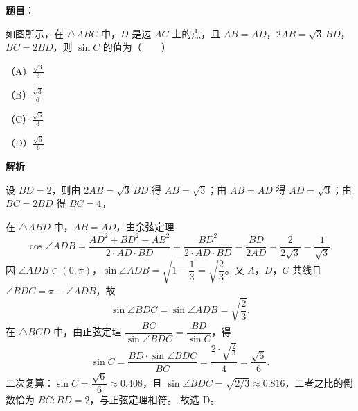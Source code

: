 \begin{answer}

\textbf{题目}：

如图所示，在 $\triangle ABC$ 中，$D$ 是边 $AC$ 上的点，且 $AB=AD$，$2AB=\sqrt3\,BD$，$BC=2BD$，则 $\sin C$ 的值为\mbox{（　　）}

（A）$\frac{\sqrt3}{3}$

（B）$\frac{\sqrt3}{6}$

（C）$\frac{\sqrt6}{3}$

（D）$\frac{\sqrt6}{6}$
\nopagebreak[4]
\begin{center}\end{center}
\nopagebreak[4]
\textbf{解析}

设 $BD=2$，则由 $2AB=\sqrt3\,BD$ 得 $AB=\sqrt3$；由 $AB=AD$ 得 $AD=\sqrt3$；由 $BC=2BD$ 得 $BC=4$。

在 $\triangle ABD$ 中，$AB=AD$，由余弦定理
\nopagebreak[4]
\[\cos\angle ADB=\frac{AD^2+BD^2-AB^2}{2\cdot AD\cdot BD}=\frac{BD^2}{2\cdot AD\cdot BD}=\frac{BD}{2AD}=\frac{2}{2\sqrt3}=\frac{1}{\sqrt3}.\]
因 $\angle ADB\in(0,\pi)$，$\sin\angle ADB=\sqrt{1-\dfrac13}=\sqrt{\dfrac23}$。又 $A$，$D$，$C$ 共线且 $\angle BDC=\pi-\angle ADB$，故
\nopagebreak[4]
\[\sin\angle BDC=\sin\angle ADB=\sqrt{\frac23}.\]
在 $\triangle BCD$ 中，由正弦定理 $\dfrac{BC}{\sin\angle BDC}=\dfrac{BD}{\sin C}$，得
\nopagebreak[4]
\[\sin C=\frac{BD\cdot\sin\angle BDC}{BC}=\frac{2\cdot\sqrt{\frac23}}{4}=\frac{\sqrt6}{6}.\]
二次复算：$\sin C=\dfrac{\sqrt6}{6}\approx0.408$，且 $\sin\angle BDC=\sqrt{2/3}\approx0.816$，二者之比的倒数恰为 $BC:BD=2$，与正弦定理相符。
故选 D。


\end{answer}

